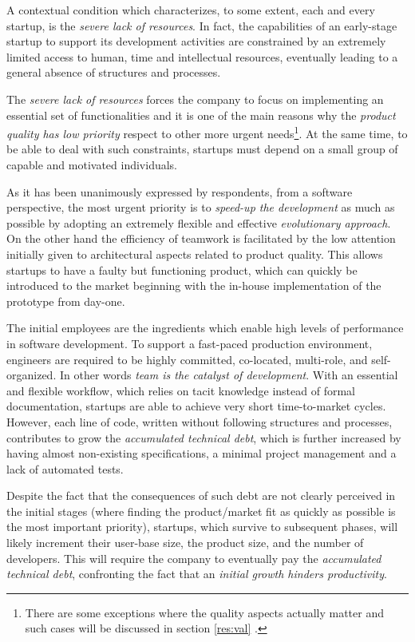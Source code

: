 \documentclass[10pt,journal,letterpaper,compsoc]{IEEEtran}
\begin{document}
A contextual condition which characterizes, to some extent, each and every 
startup, is the \textit{severe lack of resources}. In fact, the capabilities of 
an early-stage startup to support its development activities are constrained by 
an extremely limited access to human, time and intellectual resources, 
eventually leading to a general absence of structures and processes.

The \textit{severe lack of resources} forces the company to focus on 
implementing an essential set of functionalities and it is one of the main 
reasons why the \textit{product quality has low priority} respect to other more 
urgent needs\footnote{There are some exceptions where the quality aspects 
actually matter and such cases will be discussed in section \ref{res:val}%
.}. At the same time, to be able to deal with such constraints, startups must 
depend on a small group of capable and motivated individuals.

As it has been unanimously expressed by respondents, from a software 
perspective, the most urgent priority is to \textit{speed-up the development} as 
much as possible by adopting an extremely flexible and effective 
\textit{evolutionary approach}. On the other hand the efficiency of teamwork is 
facilitated by the low attention initially given to architectural aspects 
related to product quality. This allows startups to have a faulty but 
functioning product, which can quickly be introduced to the market beginning 
with the in-house implementation of the prototype from day-one.

The initial employees are the ingredients which enable high levels of 
performance in software development. To support a fast-paced production 
environment, engineers are required to be highly committed, co-located, 
multi-role, and self-organized. In other words \textit{team is the catalyst of 
development}.
With an essential and flexible workflow, which relies on tacit knowledge 
instead of formal documentation, startups are able to achieve very short 
time-to-market cycles. However, each line of code, written without following 
structures and processes, contributes to grow the \textit{accumulated technical 
debt}, which is further increased by having almost non-existing specifications, 
a minimal project management and a lack of automated tests.

Despite the fact that the consequences of such debt are not clearly perceived 
in the initial stages (where finding the product/market fit as quickly as 
possible is the most important priority), startups, which survive to subsequent 
phases, will likely increment their user-base size, the product size, and the 
number of developers. This will require the company to eventually pay the 
\textit{accumulated technical debt}, confronting the fact that an 
\textit{initial growth hinders productivity}.
\end{document}
